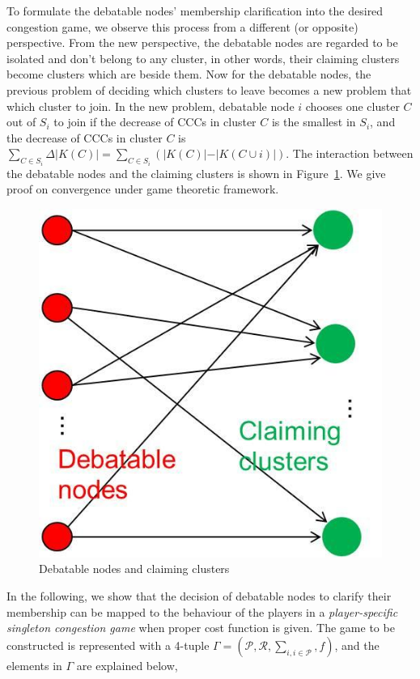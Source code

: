 \documentclass[10pt,journal,compsoc]{IEEEtran}
\theoremstyle{mytheoremstyle}
\theoremstyle{mytheoremstyle}
\theoremstyle{mytheoremstyle}
\begin{document}
To formulate the debatable nodes' membership clarification into the desired congestion game, we observe this process from a different (or opposite) perspective. 
From the new perspective, the debatable nodes are regarded to be isolated and don't belong to any cluster, in other words, their claiming clusters become clusters which are beside them. 
Now for the debatable nodes, the previous problem of deciding which clusters to leave becomes a new problem that which cluster to join.
In the new problem, debatable node $i$ chooses one cluster $C$ out of $S_i$ to join if the decrease of CCCs in cluster $C$ is the smallest in $S_i$, and the decrease of CCCs in cluster $C$ is $\sum_{C\in S_i}\Delta\vert K(C) \vert=\sum_{C\in S_i}({\vert K(C) \vert-\vert K(C\cup i) \vert})$.
The interaction between the debatable nodes and the claiming clusters is shown in Figure~\ref{debatable_nodes_claiming_cluster}.
We give proof on convergence under game theoretic framework.
\begin{figure}[ht!]
  \centering
  \includegraphics[width=0.25\linewidth]{singletongame_png.png}
  \caption{Debatable nodes and claiming clusters}
  \label{debatable_nodes_claiming_cluster}
\end{figure}




In the following, we show that the decision of debatable nodes to clarify their membership can be mapped to the behaviour of the players in a \textit{player-specific singleton congestion game} when proper cost function is given.
The game to be constructed is represented with a 4-tuple $\Gamma=(\mathcal{P},\mathcal{R},\sum_{i, i \in \mathcal{P}}, f)$, and the elements in $\Gamma$ are explained below,
\end{document}
